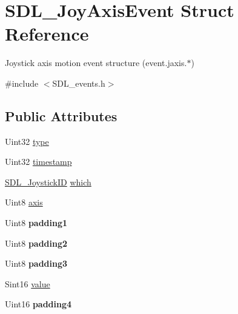 \hypertarget{struct_s_d_l___joy_axis_event}{}\section{S\+D\+L\+\_\+\+Joy\+Axis\+Event Struct Reference}
\label{struct_s_d_l___joy_axis_event}


Joystick axis motion event structure (event.\+jaxis.$\ast$)  




{\ttfamily \#include $<$S\+D\+L\+\_\+events.\+h$>$}

\subsection*{Public Attributes}
\begin{DoxyCompactItemize}
\item 
Uint32 \mbox{\hyperlink{struct_s_d_l___joy_axis_event_aed1c873fb90ba58194e65f972933c67d}{type}}
\item 
Uint32 \mbox{\hyperlink{struct_s_d_l___joy_axis_event_a60ecfc70df9eeef8e33b5dd7dc060389}{timestamp}}
\item 
\mbox{\hyperlink{_s_d_l__joystick_8h_a3c3d32500cb08f76ee8077983912c0bd}{S\+D\+L\+\_\+\+Joystick\+ID}} \mbox{\hyperlink{struct_s_d_l___joy_axis_event_a965719f4703a7091bcc5f07f79fcf7e1}{which}}
\item 
Uint8 \mbox{\hyperlink{struct_s_d_l___joy_axis_event_a0beac2fb161e45771c424bd0b6daeabb}{axis}}
\item 
\mbox{\label{struct_s_d_l___joy_axis_event_ae8e17bced478530638982f0382a0dafa}} 
Uint8 {\bfseries padding1}
\item 
\mbox{\label{struct_s_d_l___joy_axis_event_ad5407250032f618fde7437ac5f229257}} 
Uint8 {\bfseries padding2}
\item 
\mbox{\label{struct_s_d_l___joy_axis_event_a8bf5144fddc19686c2003add1f0e1565}} 
Uint8 {\bfseries padding3}
\item 
Sint16 \mbox{\hyperlink{struct_s_d_l___joy_axis_event_a53ee73e7c367934dd6edb69963be5556}{value}}
\item 
\mbox{\label{struct_s_d_l___joy_axis_event_a604b258940a8cd8beaa5efeb55d6f825}} 
Uint16 {\bfseries padding4}
\end{DoxyCompactItemize}


